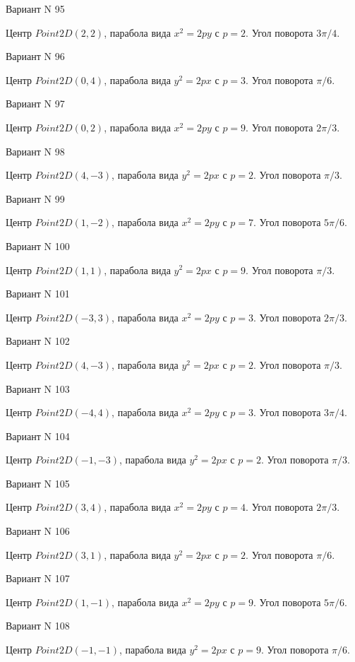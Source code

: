 \documentclass[11pt]{report}
\begin{document}
Вариант N 95

Центр $Point2D\left(2, 2\right)$, парабола вида $x^{2} = 2py$ с $p = 2$. Угол поворота $3 \pi / 4$.

Вариант N 96

Центр $Point2D\left(0, 4\right)$, парабола вида $y^{2} = 2px$ с $p = 3$. Угол поворота $\pi / 6$.

Вариант N 97

Центр $Point2D\left(0, 2\right)$, парабола вида $x^{2} = 2py$ с $p = 9$. Угол поворота $2 \pi / 3$.

Вариант N 98

Центр $Point2D\left(4, -3\right)$, парабола вида $y^{2} = 2px$ с $p = 2$. Угол поворота $\pi / 3$.

Вариант N 99

Центр $Point2D\left(1, -2\right)$, парабола вида $x^{2} = 2py$ с $p = 7$. Угол поворота $5 \pi / 6$.

Вариант N 100

Центр $Point2D\left(1, 1\right)$, парабола вида $y^{2} = 2px$ с $p = 9$. Угол поворота $\pi / 3$.

Вариант N 101

Центр $Point2D\left(-3, 3\right)$, парабола вида $x^{2} = 2py$ с $p = 3$. Угол поворота $2 \pi / 3$.

Вариант N 102

Центр $Point2D\left(4, -3\right)$, парабола вида $y^{2} = 2px$ с $p = 2$. Угол поворота $\pi / 3$.

Вариант N 103

Центр $Point2D\left(-4, 4\right)$, парабола вида $x^{2} = 2py$ с $p = 3$. Угол поворота $3 \pi / 4$.

Вариант N 104

Центр $Point2D\left(-1, -3\right)$, парабола вида $y^{2} = 2px$ с $p = 2$. Угол поворота $\pi / 3$.

Вариант N 105

Центр $Point2D\left(3, 4\right)$, парабола вида $x^{2} = 2py$ с $p = 4$. Угол поворота $2 \pi / 3$.

Вариант N 106

Центр $Point2D\left(3, 1\right)$, парабола вида $y^{2} = 2px$ с $p = 2$. Угол поворота $\pi / 6$.

Вариант N 107

Центр $Point2D\left(1, -1\right)$, парабола вида $x^{2} = 2py$ с $p = 9$. Угол поворота $5 \pi / 6$.

Вариант N 108

Центр $Point2D\left(-1, -1\right)$, парабола вида $y^{2} = 2px$ с $p = 9$. Угол поворота $\pi / 6$.
\end{document}
